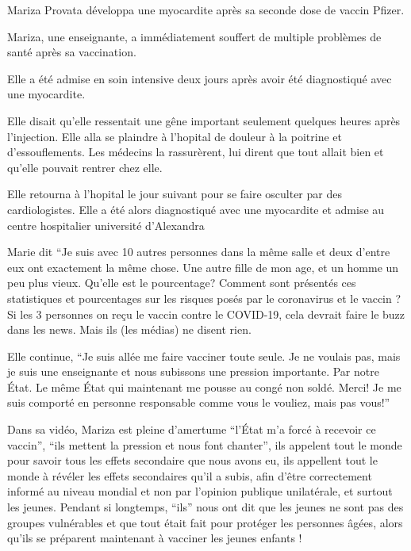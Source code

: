 Mariza Provata développa une myocardite après sa seconde dose de vaccin Pfizer.

Mariza, une enseignante, a immédiatement souffert de multiple problèmes de santé
après sa vaccination.

Elle a été admise en soin intensive deux jours après avoir été diagnostiqué avec
une myocardite.

Elle disait qu'elle ressentait une gêne important seulement quelques heures
après l'injection. Elle alla se plaindre à l'hopital de douleur à la poitrine et
d'essouflements. Les médecins la rassurèrent, lui dirent que tout allait bien et
qu'elle pouvait rentrer chez elle.

Elle retourna à l'hopital le jour suivant pour se faire osculter par des
cardiologistes. Elle a été alors diagnostiqué avec une myocardite et admise au
centre hospitalier université d'Alexandra

Marie dit “Je suis avec 10 autres personnes dans la même salle et deux d'entre
eux ont exactement la même chose. Une autre fille de mon age, et un homme un peu
plus vieux. Qu'elle est le pourcentage? Comment sont présentés ces statistiques
et pourcentages sur les risques posés par le coronavirus et le vaccin ? Si les 3
personnes on reçu le vaccin contre le COVID-19, cela devrait faire le buzz dans
les news. Mais ils (les médias) ne disent rien.

Elle continue, “Je suis allée me faire vacciner toute seule. Je ne voulais pas,
mais je suis une enseignante et nous subissons une pression importante. Par
notre État. Le même État qui maintenant me pousse au congé non soldé. Merci! Je
me suis comporté en personne responsable comme vous le vouliez, mais pas vous!”

Dans sa vidéo, Mariza est pleine d'amertume “l'État m'a forcé à recevoir ce
vaccin”, “ils mettent la pression et nous font chanter”, ils appelent tout le
monde pour savoir tous les effets secondaire que nous avons eu, ils appellent
tout le monde à révéler les effets secondaires qu'il a subis, afin d'être
correctement informé au niveau mondial et non par l'opinion publique
unilatérale, et surtout les jeunes. Pendant si longtemps, “ils” nous ont dit que
les jeunes ne sont pas des groupes vulnérables et que tout était fait pour
protéger les personnes âgées, alors qu'ils se préparent maintenant à vacciner
les jeunes enfants !

